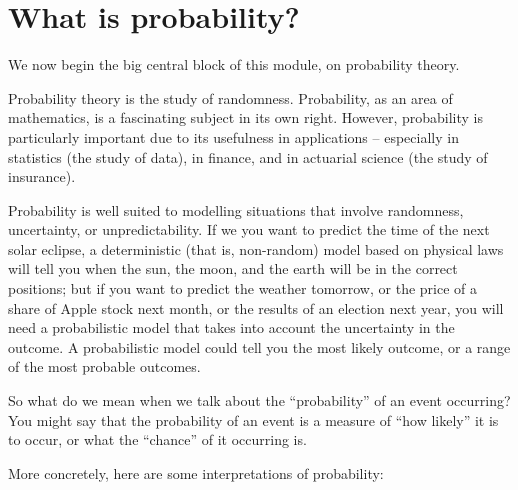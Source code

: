 \documentclass[
  a4paper,
]{book}
\theoremstyle{definition}
\theoremstyle{definition}
\theoremstyle{definition}
\theoremstyle{definition}
\theoremstyle{remark}
\begin{document}
\renewcommand{\complement}{\mathsf{c}}
\newcommand{\comp}{\complement}
\newcommand{\ff}[2]{{#1}^{\underline{#2}}}

\hypertarget{what-is-prob}{%
\section{What is probability?}\label{what-is-prob}}

We now begin the big central block of this module, on probability theory.

Probability theory is the study of randomness. Probability, as an area of mathematics, is a fascinating subject in its own right. However, probability is particularly important due to its usefulness in applications -- especially in statistics (the study of data), in finance, and in actuarial science (the study of insurance).

Probability is well suited to modelling situations that involve randomness, uncertainty, or unpredictability. If we you want to predict the time of the next solar eclipse, a deterministic (that is, non-random) model based on physical laws will tell you when the sun, the moon, and the earth will be in the correct positions; but if you want to predict the weather tomorrow, or the price of a share of Apple stock next month, or the results of an election next year, you will need a probabilistic model that takes into account the uncertainty in the outcome. A probabilistic model could tell you the most likely outcome, or a range of the most probable outcomes.

So what do we mean when we talk about the ``probability'' of an event occurring? You might say that the probability of an event is a measure of ``how likely'' it is to occur, or what the ``chance'' of it occurring is.

More concretely, here are some interpretations of probability:
\end{document}
